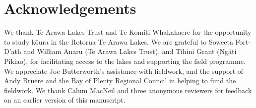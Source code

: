 \documentclass[
  12pt,
  a4paper,
  oneside]{scrbook}
\begin{document}
\section{Acknowledgements}\label{acknowledgements-2}

We thank Te Arawa Lakes Trust and Te Komiti Whakahaere for the
opportunity to study kōura in the Rotorua Te Arawa Lakes. We are
grateful to Soweeta Fort-D'ath and William Anaru (Te Arawa Lakes Trust),
and Tihini Grant (Ngāti Pikiao), for facilitating access to the lakes
and supporting the field programme. We appreciate Joe Butterworth's
assistance with fieldwork, and the support of Andy Bruere and the Bay of
Plenty Regional Council in helping to fund the fieldwork. We thank Calum
MacNeil and three anonymous reviewers for feedback on an earlier version
of this manuscript.
\end{document}

